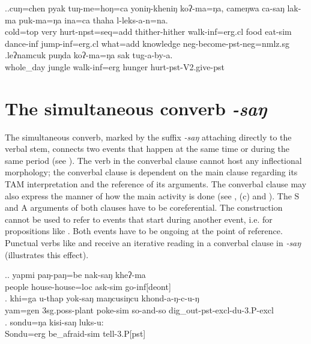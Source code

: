 \ex.\ag.\label{cungchen}cuŋ=chen   pyak  tuŋ-me=hoŋ=ca yoniŋ-kheniŋ  koʔ-ma=ŋa, cameŋwa  ca-saŋ  lak-ma      puk-ma=ŋa  ina=ca   thaha l-leks-a-n=na.\\
cold{\sc =top} very hurt{\sc -npst=seq=add} thither-hither walk{\sc -inf=erg.cl} food eat{\sc -sim} dance{\sc -inf} jump{\sc -inf=erg.cl} what{\sc =add} knowledge {\sc neg-}become{\sc -pst-neg=nmlz.sg}\\
  
\bg.leʔnamcuk     puŋda koʔ-ma=ŋa         sak    tug-a-by-a.\\
whole\_day jungle walk{\sc -inf=erg} hunger hurt{\sc [3sg]-pst-V2.give-pst}\\
 

		
\section{The simultaneous converb \emph{-saŋ}}\label{sim}

The simultaneous converb, marked by the suffix \emph{-saŋ} attaching directly to the verbal stem, connects two events that happen at the same time or during the same period (see \Next[a]). The verb in the converbal clause cannot host any inflectional morphology; the converbal clause is dependent on the main clause regarding its TAM interpretation and the reference of its arguments. The converbal clause may also express the manner of how the main activity is done (see \Next[b], (c) and \NNext).  The S and A arguments of both clauses have to be coreferential. The construction cannot be used to refer to events that start during another event, i.e. for propositions like . Both events have to be ongoing at the point of reference. Punctual verbs like  and  receive an iterative reading in a converbal clause in \emph{-saŋ} (\Next[b] illustrates this effect).

		 \ex.\ag. yapmi  paŋ-paŋ=be nak-saŋ kheʔ-ma\\
		people   house-house{\sc =loc} ask{\sc -sim} go{\sc -inf[deont]}\\
	 
	\bg.	khi=ga u-thap yok-saŋ maŋcusiŋcu khond-a-ŋ-c-u-ŋ\\
			yam{\sc =gen} {\sc 3sg.poss-}plant   poke-{\sc sim} so-and-so dig\_out{\sc -pst-excl-du-3.P-excl}\\
			  
	\bg. sondu=ŋa    kisi-saŋ             luks-u:	\\
	Sondu{\sc =erg} be\_afraid{\sc -sim} tell{\sc -3.P[pst]}\\

